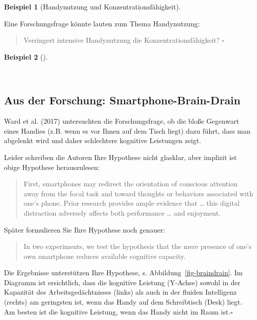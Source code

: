 \documentclass[
  letterpaper,
]{scrbook}
\theoremstyle{definition}
\newtheorem{example}{Beispiel}[chapter]
\theoremstyle{definition}
\theoremstyle{definition}
\theoremstyle{remark}
\begin{document}
\begin{example}[Handynutzung und
Konzentrationsfähigkeit]\protect\hypertarget{exm-braindrain}{}\label{exm-braindrain}

Eine Forschungsfrage könnte lauten zum Thema Handynutzung:

\begin{quote}
Verringert intensive Handynutzung die Konzentrationsfähigkeit?
\(\square\)
\end{quote}

\end{example}

\begin{example}[]\protect\hypertarget{exm-braindrain2}{}\label{exm-braindrain2}

~

\subsection{Aus der Forschung:
Smartphone-Brain-Drain}\label{aus-der-forschung-smartphone-brain-drain-1}

Ward et al. (2017) untersuchten die Forschungsfrage, ob die bloße
Gegenwart eines Handies (z.B. wenn es vor Ihnen auf dem Tisch liegt)
dazu führt, dass man abgelenkt wird und daher schlechtere kognitive
Leistungen zeigt.

Leider schreiben die Autoren Ihre Hypothese nicht glasklar, aber
implizit ist obige Hypothese herauszulesen:

\begin{quote}
First, smartphones may redirect the orientation of conscious attention
away from the focal task and toward thoughts or behaviors associated
with one's phone. Prior research provides ample evidence that \ldots{}
this digital distraction adversely affects both performance \ldots{} and
enjoyment.
\end{quote}

Später formulieren Sie Ihre Hypothese noch genauer:

\begin{quote}
In two experiments, we test the hypothesis that the mere presence of
one's own smartphone reduces available cognitive capacity.
\end{quote}

Die Ergebnisse unterstützen Ihre Hypothese, s.
Abbildung~\ref{fig-braindrain}. Im Diagramm ist ersichtlich, dass die
kognitive Leistung (Y-Achse) sowohl in der Kapazität des
Arbeitsgedächtnisses (links) als auch in der fluiden Intelligenz
(rechts) am geringsten ist, wenn das Handy auf dem Schreibtisch (Desk)
liegt. Am besten ist die kognitive Leistung, wenn das Handy nicht im
Raum ist.\(\square\)


\end{example}
\end{document}
